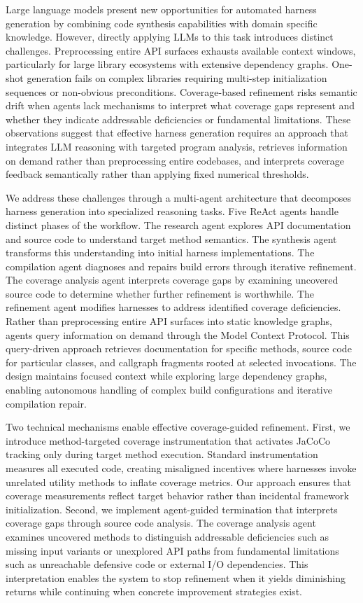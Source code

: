 Large language models present new opportunities for automated harness generation by combining code synthesis capabilities with domain specific knowledge. However, directly applying LLMs to this task introduces distinct challenges. Preprocessing entire API surfaces exhausts available context windows, particularly for large library ecosystems with extensive dependency graphs. One-shot generation fails on complex libraries requiring multi-step initialization sequences or non-obvious preconditions. Coverage-based refinement risks semantic drift when agents lack mechanisms to interpret what coverage gaps represent and whether they indicate addressable deficiencies or fundamental limitations. These observations suggest that effective harness generation requires an approach that integrates LLM reasoning with targeted program analysis, retrieves information on demand rather than preprocessing entire codebases, and interprets coverage feedback semantically rather than applying fixed numerical thresholds.

We address these challenges through a multi-agent architecture that decomposes harness generation into specialized reasoning tasks. Five ReAct agents handle distinct phases of the workflow. The research agent explores API documentation and source code to understand target method semantics. The synthesis agent transforms this understanding into initial harness implementations. The compilation agent diagnoses and repairs build errors through iterative refinement. The coverage analysis agent interprets coverage gaps by examining uncovered source code to determine whether further refinement is worthwhile. The refinement agent modifies harnesses to address identified coverage deficiencies. Rather than preprocessing entire API surfaces into static knowledge graphs, agents query information on demand through the Model Context Protocol. This query-driven approach retrieves documentation for specific methods, source code for particular classes, and callgraph fragments rooted at selected invocations. The design maintains focused context while exploring large dependency graphs, enabling autonomous handling of complex build configurations and iterative compilation repair.

Two technical mechanisms enable effective coverage-guided refinement. First, we introduce method-targeted coverage instrumentation that activates JaCoCo tracking only during target method execution. Standard instrumentation measures all executed code, creating misaligned incentives where harnesses invoke unrelated utility methods to inflate coverage metrics. Our approach ensures that coverage measurements reflect target behavior rather than incidental framework initialization. Second, we implement agent-guided termination that interprets coverage gaps through source code analysis. The coverage analysis agent examines uncovered methods to distinguish addressable deficiencies such as missing input variants or unexplored API paths from fundamental limitations such as unreachable defensive code or external I/O dependencies. This interpretation enables the system to stop refinement when it yields diminishing returns while continuing when concrete improvement strategies exist.

